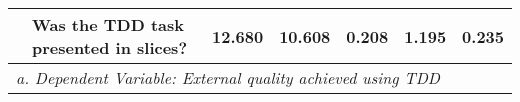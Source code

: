 \begin{table}[h]
{\begin{tabular}{|llrrrrr}
\multicolumn{1}{|l|}{}                                & \multicolumn{1}{l|}{Was the TDD task presented in slices?}                                           & \multicolumn{1}{r|}{12.680}                  & \multicolumn{1}{r|}{10.608}                           & \multicolumn{1}{r|}{0.208}                                                                         & \multicolumn{1}{r|}{1.195}                       & \multicolumn{1}{r|}{0.235}                          \\ \hline
\multicolumn{7}{|l}{\textit{a. Dependent Variable: External quality achieved using TDD}}                                                                                                                                                                                                                                                                                                                                                                                         \\ \hline
\end{tabular}
}
\end{table}